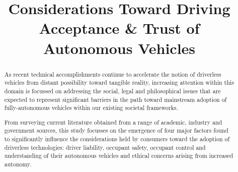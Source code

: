 \documentclass[conference]{IEEEtran}
\begin{document}
%


%

\title{Considerations Toward Driving Acceptance \& Trust of Autonomous Vehicles}

\author{
}



\maketitle

\begin{abstract}
  As recent technical accomplishments continue to accelerate the notion of driverless vehicles from distant possibility toward tangible reality, increasing attention within this domain is focussed on addressing the social, legal and philosophical issues that are expected to represent significant barriers in the path toward mainstream adoption of fully-autonomous vehicles within our existing societal frameworks.
  
From surveying current literature obtained from a range of academic, industry and government sources, this study focusses on the emergence of four major factors found to significantly influence the considerations held by consumers toward the adoption of driverless technologies: driver liability, occupant safety, occupant control and understanding of their autonomous vehicles and ethical concerns arising from increased autonomy.
\end{abstract}
\end{document}
